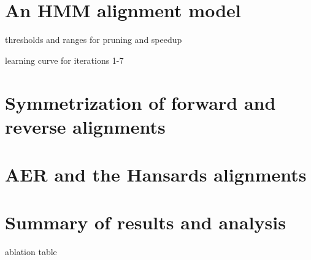 \documentclass{article}
\begin{document}
\section{An HMM alignment model}

thresholds and ranges for pruning and speedup

learning curve for iterations 1-7

\section{Symmetrization of forward and reverse alignments}

\section{AER and the Hansards alignments}

\section{Summary of results and analysis}

ablation table
\end{document}
